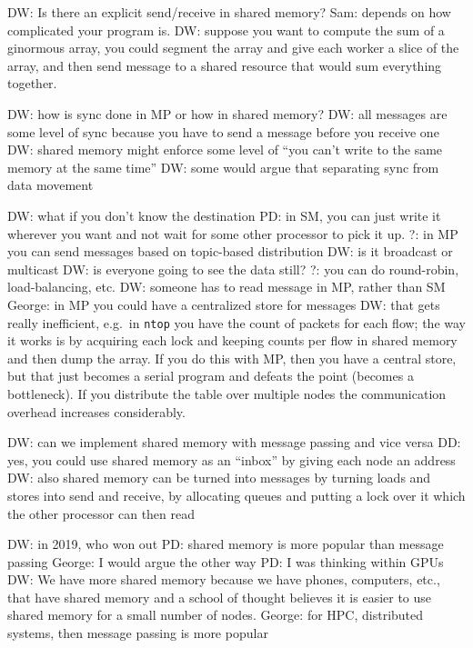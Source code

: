 DW: Is there an explicit send/receive in shared memory?
Sam: depends on how complicated your program is.
DW: suppose you want to compute the sum of a ginormous array, you could segment the array and give each worker a slice of the array, and then send message to a shared resource that would sum everything together.

DW: how is sync done in MP or how in shared memory?
DW: all messages are some level of sync because you have to send a message before you receive one
DW: shared memory might enforce some level of ``you can't write to the same memory at the same time''
DW: some would argue that separating sync from data movement

DW: what if you don't know the destination
PD: in SM, you can just write it wherever you want and not wait for some other processor to pick it up.
?: in MP you can send messages based on topic-based distribution
DW: is it broadcast or multicast
DW: is everyone going to see the data still?
?: you can do round-robin, load-balancing, etc.
DW: someone has to read message in MP, rather than SM
George: in MP you could have a centralized store for messages
DW: that gets really inefficient, e.g.\ in \texttt{ntop} you have the count of packets for each flow; the way it works is by acquiring each lock and keeping counts per flow in shared memory and then dump the array.
If you do this with MP, then you have a central store, but that just becomes a serial program and defeats the point (becomes a bottleneck). If you distribute the table over multiple nodes the communication overhead increases considerably.

DW: can we implement shared memory with message passing and vice versa
DD: yes, you could use shared memory as an ``inbox'' by giving each node an address
DW: also shared memory can be turned into messages by turning loads and stores into send and receive, by allocating queues and putting a lock over it which the other processor can then read

DW: in 2019, who won out
PD: shared memory is more popular than message passing
George: I would argue the other way
PD: I was thinking within GPUs
DW: We have more shared memory because we have phones, computers, etc., that have shared memory and a school of thought believes it is easier to use shared memory for a small number of nodes.
George: for HPC, distributed systems, then message passing is more popular

